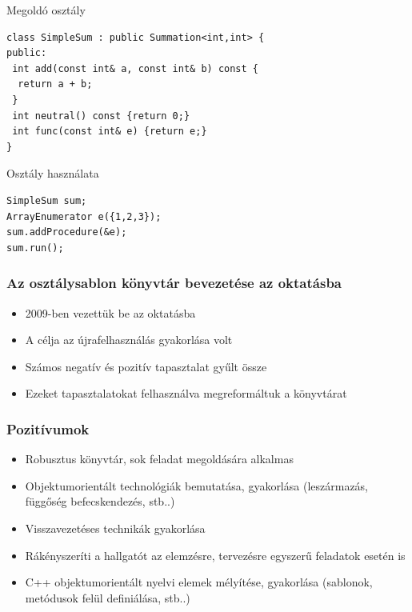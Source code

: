 \documentclass[11pt]{beamer}
\begin{document}
\begin{frame}[fragile]	
	\begin{block}{Megoldó osztály}
		\begin{lstlisting}[basicstyle=\small]
class SimpleSum : public Summation<int,int> {
public:
 int add(const int& a, const int& b) const {
  return a + b;
 }
 int neutral() const {return 0;}
 int func(const int& e) {return e;}
}
		\end{lstlisting}
	\end{block}
	
	\begin{block}{Osztály használata}
	  	\begin{lstlisting}[basicstyle=\small]
SimpleSum sum;
ArrayEnumerator e({1,2,3});
sum.addProcedure(&e);
sum.run();
		\end{lstlisting}
	\end{block}
\end{frame}

\begin{frame}
	\frametitle{Az osztálysablon könyvtár bevezetése az oktatásba}
	\begin{itemize}
		\item 2009-ben vezettük be az oktatásba
		\vspace*{2px}
		\item A célja az újrafelhasználás gyakorlása volt
		\vspace*{2px}
		\item Számos negatív és pozitív tapasztalat gyűlt össze
		\vspace*{2px}
		\item Ezeket tapasztalatokat felhasználva megreformáltuk a könyvtárat
	\end{itemize}
\end{frame}

\begin{frame}
	\frametitle{Pozitívumok}
	\begin{itemize}
		\item Robusztus könyvtár, sok feladat megoldására alkalmas
		\item Objektumorientált technológiák bemutatása, gyakorlása (leszármazás, függőség befecskendezés, stb..) 
		\vspace*{8px}
		\item Visszavezetéses technikák gyakorlása
		\vspace*{8px}
		\item Rákényszeríti a hallgatót az elemzésre, tervezésre egyszerű feladatok esetén is
		\item C++ objektumorientált nyelvi elemek mélyítése, gyakorlása (sablonok, metódusok felül definiálása, stb..)
		
	\end{itemize}
\end{frame}
\end{document}
